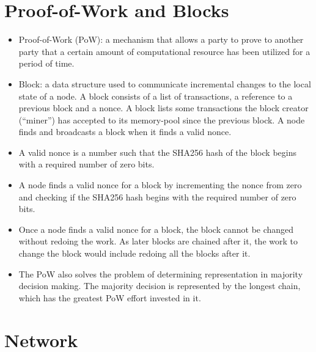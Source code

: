 \documentclass{article}
\begin{document}
\section{Proof-of-Work and Blocks}

\begin{itemize}
  \item Proof-of-Work (PoW): a mechanism that allows a party to prove to another
    party that a certain amount of computational resource has been utilized for
    a period of time.
  \item Block: a data structure used to communicate incremental changes to the
    local state of a node. A block consists of a list of transactions, a
    reference to a previous block and a nonce. A block lists some transactions
    the block creator (``miner'') has accepted to its memory-pool since the
    previous block. A node finds and broadcasts a block when it finds a valid
    nonce.
  \item A valid nonce is a number such that the SHA256 hash of the block begins
    with a required number of zero bits.
  \item A node finds a valid nonce for a block by incrementing the nonce from
    zero and checking if the SHA256 hash begins with the required number of zero
    bits.
  \item Once a node finds a valid nonce for a block, the block cannot be changed
    without redoing the work. As later blocks are chained after it, the work to
    change the block would include redoing all the blocks after it.
  \item The PoW also solves the problem of determining representation in
    majority decision making. The majority decision is represented by the
    longest chain, which has the greatest PoW effort invested in it.
\end{itemize}

\section{Network}
\end{document}
